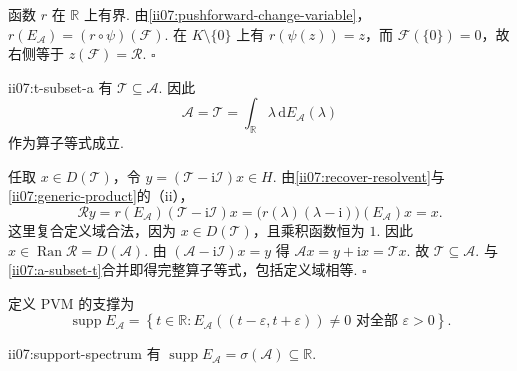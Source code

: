 \begin{FAProof}
函数 \(\displaystyle r\) 在 \(\displaystyle\mathbb R\) 上有界. 由\autoref{ii07:pushforward-change-variable}，
\(\displaystyle r(E_{\mathcal A})=(r\circ\psi)(\mathcal F).\)
在 \(\displaystyle K\setminus\{0\}\) 上有 \(\displaystyle r(\psi(z))=z\)，而 \(\displaystyle\mathcal F(\{0\})=0\)，故右侧等于 \(\displaystyle z(\mathcal F)=\mathcal R\).
\hfill\(\square\)
\end{FAProof}

\begin{FAProposition}{ii07:t-subset-a}
有
\(\displaystyle \mathcal T\subseteq\mathcal A.\)
因此
\[
\mathcal A
=
\mathcal T
=
\int_{\mathbb R}\lambda\,\mathrm{d}E_{\mathcal A}(\lambda)
\]
作为算子等式成立.
\end{FAProposition}

\begin{FAProof}
任取 \(\displaystyle x\in D(\mathcal T)\)，令
\(\displaystyle y=(\mathcal T-\mathrm{i}\mathcal I)x\in H.\)
由\autoref{ii07:recover-resolvent}与\autoref{ii07:generic-product}的（ii），
\[
\mathcal Ry=r(E_{\mathcal A})(\mathcal T-\mathrm{i}\mathcal I)x=\bigl(r(\lambda)(\lambda-\mathrm{i})\bigr)(E_{\mathcal A})x=x.
\]
这里复合定义域合法，因为 \(\displaystyle x\in D(\mathcal T)\)，且乘积函数恒为 \(\displaystyle1\). 因此
\(\displaystyle x\in\operatorname{Ran}\mathcal R=D(\mathcal A).\)
由 \(\displaystyle(\mathcal A-\mathrm{i}\mathcal I)x=y\) 得
\(\displaystyle \mathcal Ax=y+\mathrm{i}x=\mathcal Tx.\)
故 \(\displaystyle\mathcal T\subseteq\mathcal A\). 与\autoref{ii07:a-subset-t}合并即得完整算子等式，包括定义域相等.
\hfill\(\square\)
\end{FAProof}

定义 PVM 的支撑为
\[
\operatorname{supp}E_{\mathcal A}
=
\left\{
 t\in\mathbb R:
 E_{\mathcal A}((t-\varepsilon,t+\varepsilon))\neq0
 \text{ 对全部 }\varepsilon>0
\right\}.
\]

\begin{FAProposition}[B][谱测度支撑等于算子谱]{ii07:support-spectrum}
有
\(\displaystyle \operatorname{supp}E_{\mathcal A}=\sigma(\mathcal A)\subseteq\mathbb R.\)
\end{FAProposition}

